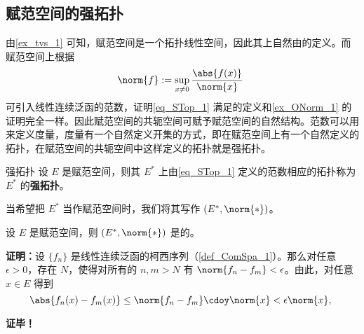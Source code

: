 
\subsection{赋范空间的强拓扑}

由\autoref{ex_tvs_1} 可知，赋范空间是一个拓扑线性空间，因此其上自然由的定义。而赋范空间上根据
\begin{equation}\label{eq_STop_1}
\norm{f}:=\sup_{x\neq0}\frac{\abs{f(x)}}{\norm{x}}~
\end{equation}
可引入线性连续泛函的范数，证明\autoref{eq_STop_1} 满足的定义和\autoref{ex_ONorm_1} 的证明完全一样。因此赋范空间的共轭空间可赋予赋范空间的自然结构。范数可以用来定义度量，度量有一个自然定义开集的方式，即在赋范空间上有一个自然定义的拓扑，在赋范空间的共轭空间中这样定义的拓扑就是强拓扑。
\begin{definition}{强拓扑}
设 $E$ 是赋范空间，则其 $E^*$ 上由\autoref{eq_STop_1} 定义的范数相应的拓扑称为 $E^*$ 的\textbf{强拓扑}。
\end{definition}

当希望把 $E^*$ 当作赋范空间时，我们将其写作 $(E^*,\norm{*})$。

\begin{theorem}{}
设 $E$ 是赋范空间，则 $(E^*,\norm{*})$ 是的。
\end{theorem}

\textbf{证明：}设 $\{f_n\}$ 是线性连续泛函的柯西序列（\autoref{def_ComSpa_1}）。那么对任意 $\epsilon>0$，存在 $N$，使得对所有的 $n,m>N$ 有 $\norm{f_n-f_m}<\epsilon$。由此，对任意 $x\in E$ 得到
\begin{equation}
\abs{f_n(x)-f_m(x)}\leq\norm{f_n-f_m}\cdoy\norm{x}<\epsilon\norm{x},~
\end{equation}



\textbf{证毕！}


